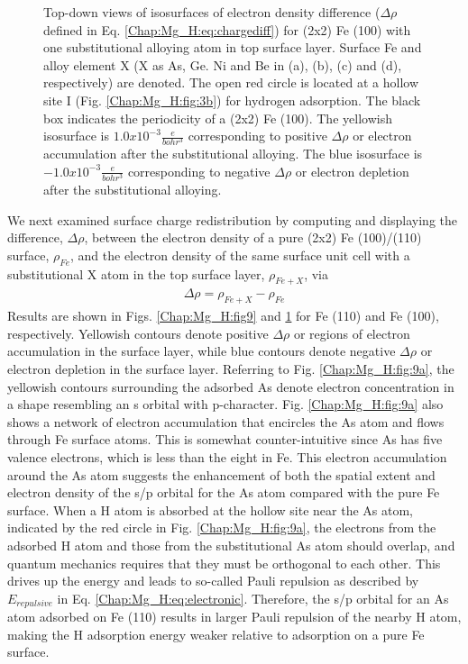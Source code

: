 \begin{figure}[!ht]
\caption[Top-down views of isosurfaces of electron density difference for (2x2) Fe (100) with one substitutional alloying atom in top surface layer]{Top-down views of isosurfaces of electron density difference ($\Delta \rho$ defined in Eq. \ref{Chap:Mg_H:eq:chargediff}) for (2x2) Fe (100) with one substitutional alloying atom in top surface layer. Surface Fe and alloy element X (X as As, Ge. Ni and Be in (a), (b), (c) and (d), respectively) are denoted. The open red circle is located at a hollow site I (Fig. \ref{Chap:Mg_H:fig:3b}) for hydrogen adsorption. The black box indicates the periodicity of a (2x2) Fe (100). The yellowish isosurface is $1.0x10^{-3}\frac{e}{bohr^3}$ corresponding to positive $\Delta \rho$ or electron accumulation after the substitutional alloying. The blue isosurface is $-1.0x10^{-3}\frac{e}{bohr^3}$ corresponding to negative $\Delta \rho$ or electron depletion after the substitutional alloying.}
  \label{Chap:Mg_H:fig10}
\end{figure}
\endgroup

We next examined surface charge redistribution by computing and displaying the difference, $\Delta \rho$, between the electron density of a pure (2x2) Fe (100)/(110) surface, $\rho_{Fe}$, and the electron density of the same surface unit cell with a substitutional X atom in the top surface layer, $\rho_{Fe+X}$, via
\begin{align}
\Delta \rho = \rho_{Fe+ X} - \rho_{Fe}
\label{Chap:Mg_H:eq:chargediff}
\end{align}
Results are shown in Figs. \ref{Chap:Mg_H:fig9} and \ref{Chap:Mg_H:fig10} for Fe (110) and Fe (100), respectively. Yellowish contours denote positive $\Delta \rho$ or regions of electron accumulation in the surface layer, while blue contours denote negative $\Delta \rho$ or electron depletion in the surface layer. Referring to Fig. \ref{Chap:Mg_H:fig:9a}, the yellowish contours surrounding the adsorbed As denote electron concentration in a shape resembling an s orbital with p-character. Fig. \ref{Chap:Mg_H:fig:9a} also shows a network of electron accumulation that encircles the As atom and flows through Fe surface atoms. This is somewhat counter-intuitive since As has five valence electrons, which is less than the eight in Fe. This electron accumulation around the As atom suggests the enhancement of both the spatial extent and electron density of the s/p orbital for the As atom compared with the pure Fe surface. When a H atom is absorbed at the hollow site near the As atom, indicated by the red circle in Fig. \ref{Chap:Mg_H:fig:9a}, the electrons from the adsorbed H atom and those from the substitutional As atom should overlap, and quantum mechanics requires that they must be orthogonal to each other. This drives up the energy and leads to so-called Pauli repulsion as described by $E_{repulsive}$ in Eq. \ref{Chap:Mg_H:eq:electronic}. Therefore, the s/p orbital for an As atom adsorbed on Fe (110) results in larger Pauli repulsion of the nearby H atom, making the H adsorption energy weaker relative to adsorption on a pure Fe surface. 

